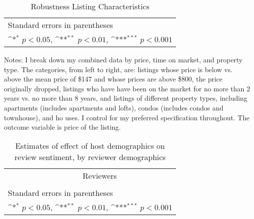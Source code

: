 \documentclass[11pt, oneside]{article}
\begin{document}
\newpage
\newpage
\begin{landscape}
	\begin{table}[htbp]\centering
		\def\sym#1{\ifmmode^{#1}\else\(^{#1}\)\fi}
		\caption{Robustness Listing Characteristics}
		\begin{tabular}{l*{9}{c}}
			\hline\hline
			
			\hline\hline
			\multicolumn{10}{l}{\footnotesize Standard errors in parentheses}\\
			\multicolumn{10}{l}{\footnotesize \sym{*} \(p<0.05\), \sym{**} \(p<0.01\), \sym{***} \(p<0.001\)}\\
		\end{tabular}
		\begin{tablenotes}

			\item Notes: I break down my combined data by price, time on market, and property type. The categories, from left to right, are: listings whose price is below vs. above the mean price of \$147 and whose prices are above \$800, the price originally dropped, listings who have have been on the market for no more than 2 years vs. no more than 8 years, and listings of different property types, including apartments (includes apartments and lofts), condos (includes condos and townhouse), and ho uses. I control for my preferred specification throughout. The outcome variable is price of the listing.
		\end{tablenotes}
	\end{table}
\end{landscape}

\centering
\begin{landscape}
\begin{table}[htbp]\centering
	\def\sym#1{\ifmmode^{#1}\else\(^{#1}\)\fi}
	\caption{Estimates of effect of host demographics on review sentiment, by reviewer demographics}
	\begin{tabular}{l *{8}{c}}
		\hline\hline
		&\multicolumn{8}{c}{Reviewers} \\
		\cmidrule(r){2-9}\\
			
		\hline\hline
		\multicolumn{9}{l}{\footnotesize Standard errors in parentheses}\\
		\multicolumn{9}{l}{\footnotesize \sym{*} \(p<0.05\), \sym{**} \(p<0.01\), \sym{***} \(p<0.001\)}\\
	\end{tabular}
\end{table}
\end{landscape}
\end{document}
